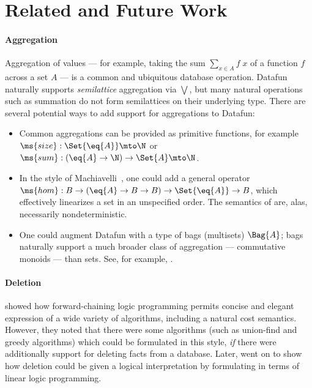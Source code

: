 \section{Related and Future Work}
\label{sec:futurework}

\paragraph{Aggregation}
Aggregation of values --- for example, taking the sum $\sum_{x \in A} f \;x$ of
a function $f$ across a set $A$ --- is a common and ubiquitous database
operation. Datafun naturally supports \emph{semilattice} aggregation via
$\bigvee$, but many natural operations such as summation do not form
semilattices on their underlying type. There are several potential ways to add
support for aggregations to Datafun:
\begin{itemize}
\item Common aggregations can be provided as primitive functions, for example
  $\ms{size} : \Set{\eq{A}} \mto \N$ or $\ms{sum} : (\eq{A} \to \N) \uto \Set{A}
  \mto \N$.

\item In the style of Machiavelli~\cite{machiavelli}, one could add a general
  operator $\ms{hom} : B \to (\eq{A} \uto B \uto B) \uto \Set{\eq{A}} \uto B$,
  which effectively linearizes a set in an unspecified order. The semantics of
   are, alas, necessarily nondeterministic.

\item One could augment Datafun with a type of bags (multisets) $\Bag{A}$; bags
  naturally support a much broader class of aggregation --- commutative monoids
  --- than sets. See, for example, \citet{multilinear-bigdata}.
\end{itemize}

\paragraph{Deletion} \citet{logical-algorithms} showed how
forward-chaining logic programming permits concise and elegant
expression of a wide variety of algorithms, including a natural cost
semantics. However, they noted that there were some algorithms (such
as union-find and greedy algorithms) which could be formulated in this
style, \emph{if} there were additionally support for deleting facts
from a database. Later, \citet{linear-logical-algorithms} went on to
show how deletion could be given a logical interpretation by
formulating in terms of linear logic programming.

